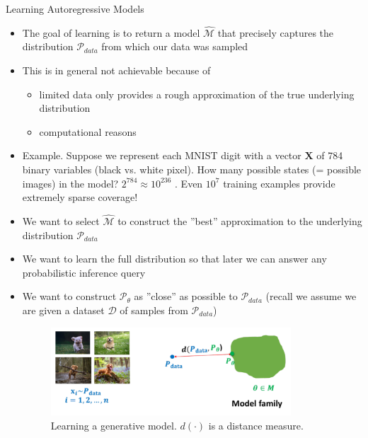 \begin{frame}[allowframebreaks]{Learning Autoregressive Models}
\begin{itemize}
    \item The goal of learning is to return a model $\hat{\mathcal{M}}$ that precisely captures the distribution $\mathcal{P}_{data}$ from which our data was sampled
    \item This is in general not achievable because of
    \begin{itemize}
        \item limited data only provides a rough approximation of the true underlying distribution
        \item computational reasons
    \end{itemize}
    \item Example. Suppose we represent each MNIST digit with a vector $\mathbf{X}$ of 784 binary variables (black vs. white pixel). How many possible states (= possible images) in the model? $2^{784} \approx 10^{236}$ . Even $10^7$ training examples provide extremely sparse coverage!
    \item We want to select $\hat{\mathcal{M}}$ to construct the ”best” approximation to the underlying distribution $\mathcal{P}_{data}$


\end{itemize}

\framebreak

\begin{itemize}
    \item We want to learn the full distribution so that later we can answer any probabilistic inference query
    \item We want to construct $\mathcal{P}_{\theta}$ as ”close” as possible to $\mathcal{P}_{data}$ (recall we assume we are given a dataset $\mathcal{D}$ of samples from $\mathcal{P}_{data}$)
    \begin{figure}
        \centering
        \includegraphics[height=1.3in]{images/autoregressive/learning.png}
        \caption*{Learning a generative model. $d(\cdot)$ is a distance measure.}
    \end{figure}
    
\end{itemize}
\end{frame}

